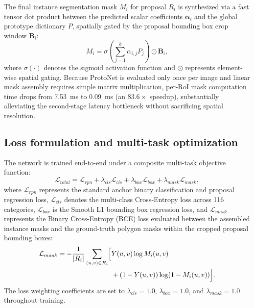 \documentclass[5p,times]{elsarticle}
\begin{document}
The final instance segmentation mask $M_i$ for proposal $R_i$ is synthesized via a fast tensor dot product between the predicted scalar coefficients $\boldsymbol{\alpha}_i$ and the global prototype dictionary $P$, spatially gated by the proposal bounding box crop window $\mathbf{B}_i$:
\begin{equation}
    M_i = \sigma\left(\sum_{j=1}^{k} \alpha_{i,j} P_j\right) \odot \mathbf{B}_i,
\end{equation}
where $\sigma(\cdot)$ denotes the sigmoid activation function and $\odot$ represents element-wise spatial gating. Because ProtoNet is evaluated only once per image and linear mask assembly requires simple matrix multiplication, per-RoI mask computation time drops from 7.53~ms to 0.09~ms (an $83.6\times$ speedup), substantially alleviating the second-stage latency bottleneck without sacrificing spatial resolution.

\subsection{Loss formulation and multi-task optimization}
The network is trained end-to-end under a composite multi-task objective function:
\begin{equation}
    \mathcal{L}_{total} = \mathcal{L}_{rpn} + \lambda_{cls} \mathcal{L}_{cls} + \lambda_{box} \mathcal{L}_{box} + \lambda_{mask} \mathcal{L}_{mask},
\end{equation}
where $\mathcal{L}_{rpn}$ represents the standard anchor binary classification and proposal regression loss, $\mathcal{L}_{cls}$ denotes the multi-class Cross-Entropy loss across 116 categories, $\mathcal{L}_{box}$ is the Smooth L1 bounding box regression loss, and $\mathcal{L}_{mask}$ represents the Binary Cross-Entropy (BCE) loss evaluated between the assembled instance masks and the ground-truth polygon masks within the cropped proposal bounding boxes:
\begin{equation}
\begin{split}
    \mathcal{L}_{mask} = -\frac{1}{|R_i|} \sum_{(u,v) \in R_i} \Bigl[ & Y(u,v) \log M_i(u,v) \\
    & + (1 - Y(u,v)) \log (1 - M_i(u,v)) \Bigr].
\end{split}
\end{equation}
The loss weighting coefficients are set to $\lambda_{cls} = 1.0$, $\lambda_{box} = 1.0$, and $\lambda_{mask} = 1.0$ throughout training.
\end{document}
